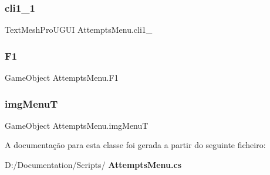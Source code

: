 \subsubsection{cli1\_1}
{\footnotesize\ttfamily Text\+Mesh\+Pro\+U\+G\+UI Attempts\+Menu.\+cli1\+\_}

\mbox{\label{class_attempts_menu_a768cb29cf25b9cbfe1058a233eeb173b}} 
\subsubsection{F1}
{\footnotesize\ttfamily Game\+Object Attempts\+Menu.\+F1}

\mbox{\label{class_attempts_menu_ab809931e6ce8f4d90114af48657f99d5}} 
\subsubsection{imgMenuT}
{\footnotesize\ttfamily Game\+Object Attempts\+Menu.\+img\+MenuT}



A documentação para esta classe foi gerada a partir do seguinte ficheiro\+:\begin{DoxyCompactItemize}
\item 
D\+:/\+Documentation/\+Scripts/\textbf{ Attempts\+Menu.\+cs}\end{DoxyCompactItemize}
